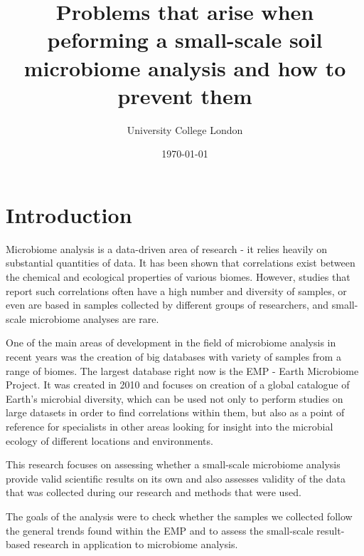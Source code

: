\documentclass[12pt,twocolumn]{article} %
\title{Problems that arise when peforming a small-scale soil microbiome analysis and how to prevent them}
\author{\normalsize University College London \\}
\date{\today}
\begin{document}
	
\maketitle
%
%
\section{Introduction}
Microbiome analysis is a data-driven area of research - it relies heavily on substantial quantities of data. It has been shown that correlations exist between the chemical and ecological properties of various biomes\cite{Thompson2017,Zhalnina2014,Martins2013}. However, studies that report such correlations often have a high number and diversity of samples, or even are based in samples collected by different groups of researchers, and small-scale microbiome analyses are rare.
\par
One of the main areas of development in the field of microbiome analysis in recent years was the creation of big databases with variety of samples from a range of biomes. The largest database right now is the EMP - Earth Microbiome Project\cite{Gilbert2014}. It was created in 2010 and focuses on creation of a global catalogue of Earth's microbial diversity, which can be used not only to perform studies on large datasets in order to find correlations within them, but also as a point of reference for specialists in other areas looking for insight into the microbial ecology of different locations and environments.
\par
This research focuses on assessing whether a small-scale microbiome analysis provide valid scientific results on its own and also assesses validity of the data that was collected during our research and methods that were used. 
\par
The goals of the analysis were to check whether the samples we collected follow the general trends found within the EMP and to assess the small-scale result-based research in application to microbiome analysis.
%
%
\end{document}
